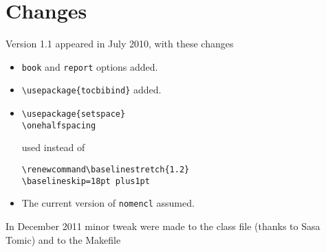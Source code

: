 \documentclass{article}
\begin{document}
\section{Changes}
Version 1.1 appeared in July 2010, with these changes 
\begin{itemize}
\item \texttt{book} and \texttt{report} options added.

\item \verb|\usepackage{tocbibind}| added.

\item
\begin{verbatim}
\usepackage{setspace}
\onehalfspacing
\end{verbatim}
used instead of 
\begin{verbatim}
\renewcommand\baselinestretch{1.2}
\baselineskip=18pt plus1pt
\end{verbatim}

\item The current version of \texttt{nomencl} assumed.
\end{itemize}

In December 2011 minor tweak were made to the class file (thanks to Sasa Tomic) and to the Makefile 
\end{document}
